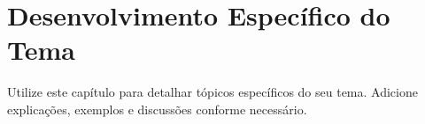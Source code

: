 \chapter{Desenvolvimento Específico do Tema}
\label{cap:desenvolvimento-especifico-do-topico-do-tema}

Utilize este capítulo para detalhar tópicos específicos do seu tema. Adicione explicações, exemplos e discussões conforme necessário.